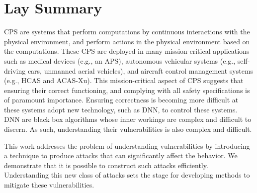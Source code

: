 

\chapter{Lay Summary}

\ac{CPS} are systems that perform computations by continuous interactions with the physical environment, and perform actions in the physical environment based on the computations. 
These \ac{CPS} are deployed in many mission-critical applications such as medical devices (e.g., an \ac{APS}), autonomous vehicular systems (e.g., self-driving cars, unmanned aerial vehicles), and aircraft control management systems (e.g.,  \ac{HCAS} and \ac{ACAS-Xu}). 
This mission-critical aspect of CPS suggests that ensuring their correct functioning, and complying with all safety specifications is of paramount importance. 
Ensuring correctness is becoming more difficult at these systems adopt new technology, such as \ac{DNN}, to control these systems. 
\ac{DNN} are black box algorithms whose inner workings are complex and difficult to discern.
As such, understanding their vulnerabilities is also complex and difficult. 

This work addresses the problem of understanding vulnerabilities by introducing a  technique to produce attacks that can significantly affect the behavior. 
We demonstrate that it is possible  to construct such attacks efficiently. 
Understanding this new class of attacks sets the stage for developing methods to mitigate these vulnerabilities. 



 



